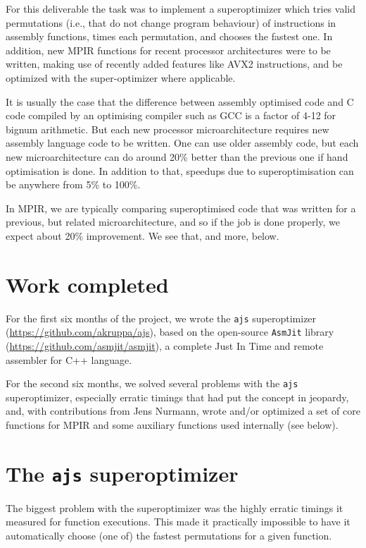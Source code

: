 For this deliverable the task was to implement a superoptimizer which
tries valid permutations (i.e., that do not change program behaviour) of
instructions in assembly functions, times each permutation, and chooses
the fastest one. In addition, new MPIR functions for recent processor
architectures were to be written, making use of recently added features
like AVX2 instructions, and be optimized with the super-optimizer where
applicable.

It is usually the case that the difference between assembly optimised
code and C code compiled by an optimising compiler such as GCC is a
factor of 4-12 for bignum arithmetic. But each new processor
microarchitecture requires new assembly language code to be written. One
can use older assembly code, but each new microarchitecture can do
around 20\% better than the previous one if hand optimisation is done.
In addition to that, speedups due to superoptimisation can be anywhere
from 5\% to 100\%.

In MPIR, we are typically comparing superoptimised code that was written
for a previous, but related microarchitecture, and so if the job is done
properly, we expect about 20\% improvement. We see that, and more,
below.

\section*{Work completed}\label{work-completed}

For the first six months of the project, we wrote the \texttt{ajs}
superoptimizer (\url{https://github.com/akruppa/ajs}), based on the
open-source \texttt{AsmJit} library
(\url{https://github.com/asmjit/asmjit}), a complete Just In Time and
remote assembler for C++ language.

For the second six months, we solved several problems with the
\texttt{ajs} superoptimizer, especially erratic timings that had put the
concept in jeopardy, and, with contributions from Jens Nurmann, wrote
and/or optimized a set of core functions for MPIR and some auxiliary
functions used internally (see below).

\section*{\texorpdfstring{The \texttt{ajs}
superoptimizer}{The ajs superoptimizer}}\label{the-ajs-superoptimizer}

The biggest problem with the superoptimizer was the highly erratic
timings it measured for function executions. This made it practically
impossible to have it automatically choose (one of) the fastest
permutations for a given function.

